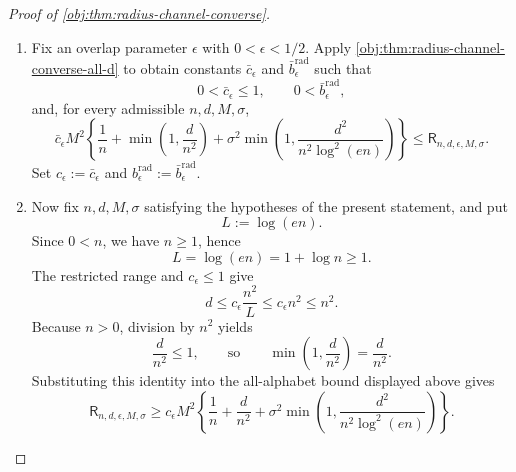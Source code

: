 \documentclass[11pt]{article}
\begin{document}
\begin{proof}[Proof of \cref{obj:thm:radius-channel-converse}]
\begin{enumerate}
\item Fix an overlap parameter \(\epsilon\) with \(0<\epsilon<1/2\).  Apply \cref{obj:thm:radius-channel-converse-all-d} to obtain constants \(\bar c_{\epsilon}\) and \(\bar b_{\epsilon}^{\mathrm{rad}}\) such that
\[
0<\bar c_{\epsilon}\le 1,
\qquad
0<\bar b_{\epsilon}^{\mathrm{rad}},
\]
and, for every admissible \(n,d,M,\sigma\),
\[
\bar c_{\epsilon}M^2
\left\{
\frac1n+\min\left(1,\frac d{n^2}\right)
+\sigma^2
\min\left(1,\frac{d^2}{n^2\log^2(en)}\right)
\right\}
\le
\mathsf R_{n,d,\epsilon,M,\sigma}.
\]
Set \(c_{\epsilon}:=\bar c_{\epsilon}\) and
\(b_{\epsilon}^{\mathrm{rad}}:=\bar b_{\epsilon}^{\mathrm{rad}}\). %

\item Now fix \(n,d,M,\sigma\) satisfying the hypotheses of the present statement, and put
\[
L:=\log(en).
\]
Since \(0<n\), we have \(n\ge1\), hence
\[
L=\log(e n)=1+\log n\ge1.
\]
The restricted range and \(c_{\epsilon}\le1\) give
\[
d\le c_{\epsilon}\frac{n^2}{L}
\le c_{\epsilon}n^2
\le n^2 .
\]
Because \(n>0\), division by \(n^2\) yields
\[
\frac d{n^2}\le1,
\qquad\text{so}\qquad
\min\left(1,\frac d{n^2}\right)=\frac d{n^2}.
\]
Substituting this identity into the all-alphabet bound displayed above gives
\[
\mathsf R_{n,d,\epsilon,M,\sigma}
\ge
c_{\epsilon}M^2
\left\{
\frac1n+\frac d{n^2}
+\sigma^2
\min\left(1,\frac{d^2}{n^2\log^2(en)}\right)
\right\}.
\] %


\end{enumerate}
\end{proof}
\end{document}

